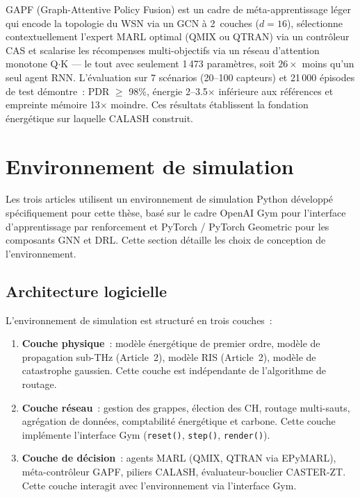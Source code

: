 GAPF (Graph-Attentive Policy Fusion) est un cadre de méta-apprentissage léger qui encode la topologie du WSN via un GCN à 2~couches ($d = 16$), sélectionne contextuellement l'expert MARL optimal (QMIX ou QTRAN) via un contrôleur CAS et scalarise les récompenses multi-objectifs via un réseau d'attention monotone Q$\cdot$K --- le tout avec seulement 1\,473 paramètres, soit $26\times$ moins qu'un seul agent RNN. L'évaluation sur 7 scénarios (20--100 capteurs) et 21\,000 épisodes de test démontre~: PDR $\geq$ 98\%, énergie 2--3.5$\times$ inférieure aux références et empreinte mémoire 13$\times$ moindre. Ces résultats établissent la fondation énergétique sur laquelle CALASH construit.


\section{Environnement de simulation}\label{sec:demarche-env}

Les trois articles utilisent un environnement de simulation Python développé spécifiquement pour cette thèse, basé sur le cadre OpenAI Gym \cite{brockman2016gym} pour l'interface d'apprentissage par renforcement et PyTorch / PyTorch Geometric pour les composants GNN et DRL. Cette section détaille les choix de conception de l'environnement.

\subsection{Architecture logicielle}

L'environnement de simulation est structuré en trois couches~:
\begin{enumerate}
    \item \textbf{Couche physique}~: modèle énergétique de premier ordre, modèle de propagation sub-THz (Article~2), modèle RIS (Article~2), modèle de catastrophe gaussien. Cette couche est indépendante de l'algorithme de routage.
    \item \textbf{Couche réseau}~: gestion des grappes, élection des CH, routage multi-sauts, agrégation de données, comptabilité énergétique et carbone. Cette couche implémente l'interface Gym (\texttt{reset()}, \texttt{step()}, \texttt{render()}).
    \item \textbf{Couche de décision}~: agents MARL (QMIX, QTRAN via EPyMARL), méta-contrôleur GAPF, piliers CALASH, évaluateur-bouclier CASTER-ZT. Cette couche interagit avec l'environnement via l'interface Gym.
\end{enumerate}

